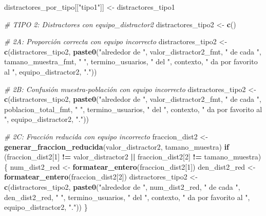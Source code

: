 \documentclass[
]{article}
\newenvironment{Shaded}{\begin{snugshade}}{\end{snugshade}}
\newcommand{\CommentTok}[1]{\textcolor[rgb]{0.56,0.35,0.01}{\textit{#1}}}
\newcommand{\ControlFlowTok}[1]{\textcolor[rgb]{0.13,0.29,0.53}{\textbf{#1}}}
\newcommand{\DecValTok}[1]{\textcolor[rgb]{0.00,0.00,0.81}{#1}}
\newcommand{\FunctionTok}[1]{\textcolor[rgb]{0.13,0.29,0.53}{\textbf{#1}}}
\newcommand{\NormalTok}[1]{#1}
\newcommand{\OtherTok}[1]{\textcolor[rgb]{0.56,0.35,0.01}{#1}}
\newcommand{\SpecialCharTok}[1]{\textcolor[rgb]{0.81,0.36,0.00}{\textbf{#1}}}
\newcommand{\StringTok}[1]{\textcolor[rgb]{0.31,0.60,0.02}{#1}}
\begin{document}
\begin{Shaded}
\begin{Highlighting}[]
\NormalTok{distractores\_por\_tipo[[}\StringTok{"tipo1"}\NormalTok{]] }\OtherTok{\textless{}{-}}\NormalTok{ distractores\_tipo1}

\CommentTok{\# TIPO 2: Distractores con equipo\_distractor2}
\NormalTok{distractores\_tipo2 }\OtherTok{\textless{}{-}} \FunctionTok{c}\NormalTok{()}

\CommentTok{\# 2A: Proporción correcta con equipo incorrecto}
\NormalTok{distractores\_tipo2 }\OtherTok{\textless{}{-}} \FunctionTok{c}\NormalTok{(distractores\_tipo2,}
  \FunctionTok{paste0}\NormalTok{(}\StringTok{"alrededor de "}\NormalTok{, valor\_distractor2\_fmt, }\StringTok{" de cada "}\NormalTok{, tamano\_muestra\_fmt, }\StringTok{" "}\NormalTok{,}
\NormalTok{         termino\_usuarios, }\StringTok{" del "}\NormalTok{, contexto, }\StringTok{" da por favorito al "}\NormalTok{, equipo\_distractor2, }\StringTok{"."}\NormalTok{))}

\CommentTok{\# 2B: Confusión muestra{-}población con equipo incorrecto}
\NormalTok{distractores\_tipo2 }\OtherTok{\textless{}{-}} \FunctionTok{c}\NormalTok{(distractores\_tipo2,}
  \FunctionTok{paste0}\NormalTok{(}\StringTok{"alrededor de "}\NormalTok{, valor\_distractor2\_fmt, }\StringTok{" de cada "}\NormalTok{, poblacion\_total\_fmt, }\StringTok{" "}\NormalTok{,}
\NormalTok{         termino\_usuarios, }\StringTok{" del "}\NormalTok{, contexto, }\StringTok{" da por favorito al "}\NormalTok{, equipo\_distractor2, }\StringTok{"."}\NormalTok{))}

\CommentTok{\# 2C: Fracción reducida con equipo incorrecto}
\NormalTok{fraccion\_dist2 }\OtherTok{\textless{}{-}} \FunctionTok{generar\_fraccion\_reducida}\NormalTok{(valor\_distractor2, tamano\_muestra)}
\ControlFlowTok{if}\NormalTok{ (fraccion\_dist2[}\DecValTok{1}\NormalTok{] }\SpecialCharTok{!=}\NormalTok{ valor\_distractor2 }\SpecialCharTok{||}\NormalTok{ fraccion\_dist2[}\DecValTok{2}\NormalTok{] }\SpecialCharTok{!=}\NormalTok{ tamano\_muestra) \{}
\NormalTok{  num\_dist2\_red }\OtherTok{\textless{}{-}} \FunctionTok{formatear\_entero}\NormalTok{(fraccion\_dist2[}\DecValTok{1}\NormalTok{])}
\NormalTok{  den\_dist2\_red }\OtherTok{\textless{}{-}} \FunctionTok{formatear\_entero}\NormalTok{(fraccion\_dist2[}\DecValTok{2}\NormalTok{])}
\NormalTok{  distractores\_tipo2 }\OtherTok{\textless{}{-}} \FunctionTok{c}\NormalTok{(distractores\_tipo2,}
    \FunctionTok{paste0}\NormalTok{(}\StringTok{"alrededor de "}\NormalTok{, num\_dist2\_red, }\StringTok{" de cada "}\NormalTok{, den\_dist2\_red, }\StringTok{" "}\NormalTok{,}
\NormalTok{           termino\_usuarios, }\StringTok{" del "}\NormalTok{, contexto, }\StringTok{" da por favorito al "}\NormalTok{, equipo\_distractor2, }\StringTok{"."}\NormalTok{))}
\NormalTok{\}}


\end{Highlighting}
\end{Shaded}
\end{document}
